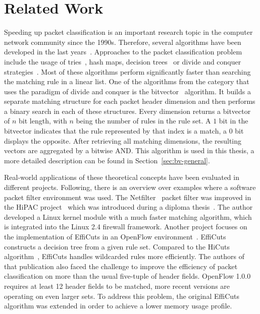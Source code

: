 \documentclass[a4paper,
		12pt,
		parskip=full,
		titlepage
		]{scrartcl}
\begin{document}
\section{Related Work}
Speeding up packet classification is an important research topic in the computer network community since the 1990s.
Therefore, several algorithms have been developed in the last years~\cite{algorithms_survey}.
Approaches to the packet classification problem include the usage of tries~\cite{tries}, 
hash maps, decision trees~\cite{hicuts, efficuts, hypercuts} or divide and conquer strategies~\cite{bv}.
Most of these algorithms perform significantly faster than searching the matching rule in a linear list.
One of the algorithms from the category that uses the paradigm of divide and conquer is the bitvector~\cite{bv} algorithm.
It builds a separate matching structure for each packet header dimension and 
then performs a binary search in each of these structures.
Every dimension returns a bitvector of $n$ bit length, with $n$ being the number of rules in the rule set.
A $1$ bit in the bitvector indicates that the rule represented by that index is a match, a $0$ bit displays the opposite.
After retrieving all matching dimensions, the resulting vectors are aggregated by a bitwise AND.
This algorithm is used in this thesis, a more detailed description can be found in Section~\ref{sec:bv-general}.

Real-world applications of these theoretical concepts have been evaluated in different projects.
Following, there is an overview over examples where a software packet filter environment was used.
The Netfilter~\cite{netfilter} packet filter was improved in the HiPAC project~\cite{hipac} 
which was introduced during a diploma thesis~\cite{heinzhigh}.
The author developed a Linux kernel module with a much faster matching algorithm, 
which is integrated into the Linux 2.4 firewall framework.
Another project focuses on the implementation of EffiCuts in an OpenFlow environment~\cite{stimpfling2013optimal}.
EffiCuts~\cite{efficuts} constructs a decision tree from a given rule set.
Compared to the HiCuts algorithm~\cite{hicuts}, EffiCuts handles wildcarded rules more efficiently.
The authors of that publication also faced the challenge to improve the efficiency 
of packet classification on more than the usual five-tuple of header fields.
OpenFlow 1.0.0~\cite{openflow_spec10} requires at least 12 header fields to 
be matched, more recent versions are operating on even larger sets.
To address this problem, the original EffiCuts algorithm was extended in order to achieve a lower memory usage profile.
\end{document}
